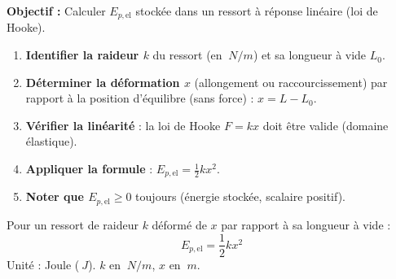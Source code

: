\documentclass[11pt]{article}
\begin{document}
\begin{methode}
    \textbf{Objectif :} Calculer $E_{p,\text{el}}$ stockée dans un ressort à réponse linéaire (loi de Hooke).
    \begin{enumerate}
        \item \textbf{Identifier la raideur $k$} du ressort (en $\SI{}{N/m}$) et sa longueur à vide $L_0$.
        \item \textbf{Déterminer la déformation $x$} (allongement ou raccourcissement) par rapport à la position d'équilibre (sans force) : $x = L - L_0$.
        \item \textbf{Vérifier la linéarité} : la loi de Hooke $F = k x$ doit être valide (domaine élastique).
        \item \textbf{Appliquer la formule} : $E_{p,\text{el}} = \frac{1}{2} k x^2$.
        \item \textbf{Noter que $E_{p,\text{el}} \ge 0$} toujours (énergie stockée, scalaire positif).
    \end{enumerate}
    \begin{aretenir}[Formule]
        Pour un ressort de raideur $k$ déformé de $x$ par rapport à sa longueur à vide :
        \[ E_{p,\text{el}} = \frac{1}{2} k x^2 \]
        Unité : Joule ($\SI{}{J}$). $k$ en $\SI{}{N/m}$, $x$ en $\SI{}{m}$.
    \end{aretenir}
\end{methode}
\end{document}
